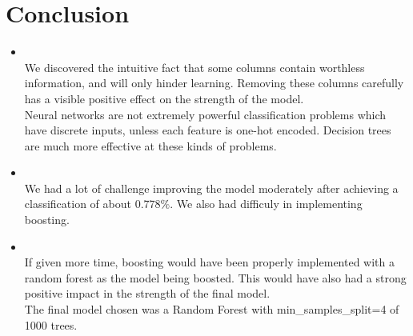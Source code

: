 \section{Conclusion}
\medskip
\begin{itemize}

    \item {} \\
    We discovered the intuitive fact that some columns contain worthless
    information, and will only hinder learning. Removing these columns
    carefully has a visible positive effect on the strength of the model. \\

    Neural networks are not extremely powerful classification problems which
    have discrete inputs, unless each feature is one-hot encoded.
    Decision trees are much more effective at these kinds of problems.

    \item {} \\
    We had a lot of challenge improving the model moderately after achieving a
    classification of about $0.778\%$. We also had difficuly in implementing
    boosting.

    \item {} \\
    If given more time, boosting would have been properly implemented with
    a random forest as the model being boosted. This would have also had a
    strong positive impact in the strength of the final model.\\

    The final model chosen was a Random Forest with min_samples_split=4 of
    1000 trees.


\end{itemize}



